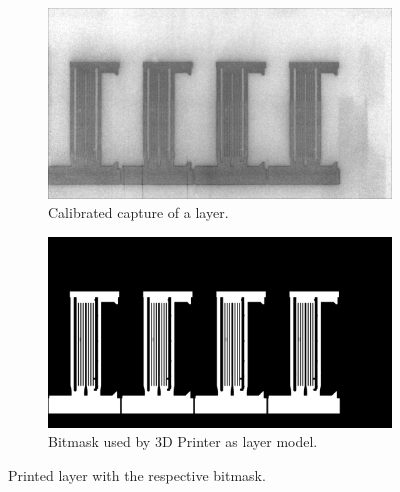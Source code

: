 \begin{figure}[ht]
  \centering

  \begin{subfigure}{\textwidth}
    \includegraphics[width=\textwidth]{images/layer_00325}
    \caption{Calibrated capture of a layer.}
    \label{fig:layer}
  \end{subfigure}

  \begin{subfigure}{\textwidth}
    \includegraphics[width=\textwidth]{images/bitmask_00325}
    \caption{Bitmask used by 3D Printer as layer model.}
  \end{subfigure}

  \caption{Printed layer with the respective bitmask.}
  \label{fig:layer_bitmask}

\end{figure}


